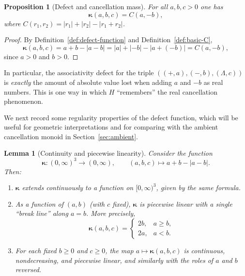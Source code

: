 \documentclass[11pt]{amsart}
\numberwithin{equation}{section}
\newtheorem{proposition}[theorem]{Proposition}
\newtheorem{lemma}[theorem]{Lemma}
\theoremstyle{definition}
\theoremstyle{remark}
\newcommand{\Hnum}{H}                      %
\newcommand{\AssocCurv}{\boldsymbol{\kappa}} %
\newcommand{\Cfun}{C}                      %
\begin{document}
\begin{proposition}[Defect and cancellation mass]
\label{prop:defect-c-mass}
For all $a,b,c>0$ one has
\[
  \AssocCurv(a,b,c) = \Cfun(a,-b),
\]
where $\Cfun(r_1,r_2) = |r_1|+|r_2|-|r_1+r_2|$.
\end{proposition}

\begin{proof}
By Definition~\ref{def:defect-function} and
Definition~\ref{def:basic-C},
\[
  \AssocCurv(a,b,c)
  = a+b-|a-b|
  = |a|+|-b|-|a+(-b)|
  = \Cfun(a,-b),
\]
since $a>0$ and $b>0$.
\end{proof}

In particular, the associativity defect for the triple
$((+,a),(-,b),(\Lambda,c))$ is \emph{exactly} the amount of absolute
value lost when adding $a$ and $-b$ as real numbers.  This is one way
in which $\Hnum$ ``remembers'' the real cancellation phenomenon.

\medskip

We next record some regularity properties of the defect function,
which will be useful for geometric interpretations and for comparing
with the ambient cancellation monoid in Section~\ref{sec:ambient}.

\begin{lemma}[Continuity and piecewise linearity]
\label{lem:defect-regularity}
Consider the function
\[
  \AssocCurv : (0,\infty)^3 \longrightarrow (0,\infty),
  \qquad
  (a,b,c)\mapsto a+b-|a-b|.
\]
Then:
\begin{enumerate}
  \item $\AssocCurv$ extends continuously to a function on
        $[0,\infty)^3$, given by the same formula.
  \item As a function of $(a,b)$ (with $c$ fixed), $\AssocCurv$ is
        piecewise linear with a single ``break line'' along $a=b$.
        More precisely,
  \[
    \AssocCurv(a,b,c)
    =
    \begin{cases}
      2b, & a\ge b,\\[2pt]
      2a, & a<b.
    \end{cases}
  \]
  \item For each fixed $b\ge0$ and $c\ge0$, the map
        $a\mapsto\AssocCurv(a,b,c)$ is continuous, nondecreasing, and
        piecewise linear, and similarly with the roles of $a$ and $b$
        reversed.
\end{enumerate}
\end{lemma}
\end{document}
